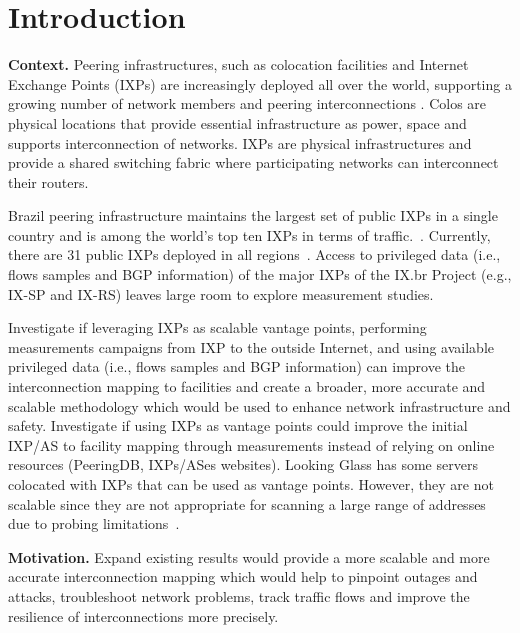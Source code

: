 \chapter{Introduction}\label{cap:introduction}
\thispagestyle{empty}

	\textbf{Context.} Peering infrastructures, such as colocation facilities and Internet Exchange Points (IXPs) are increasingly deployed all over the world, supporting a growing number of network members and peering interconnections \cite{Giotsas:2017:DPI:3098822.3098855}. Colos are physical locations that provide essential infrastructure as power, space and supports interconnection of networks. IXPs are physical infrastructures and provide a shared switching fabric where participating networks can interconnect their routers. \cite{Giotsas:2015:MPI:2716281.2836122}

	Brazil peering infrastructure maintains the largest set of public IXPs in a single country and is among the world’s top ten IXPs in terms of traffic.~\cite{DissectingBrazilianIXP}. Currently, there are 31 public IXPs deployed in all regions~\cite{IXbr}. Access to privileged data (i.e., flows samples and BGP information) of the major IXPs of the IX.br Project (e.g., IX-SP and IX-RS) leaves large room to explore measurement studies. 

	Investigate if leveraging IXPs as scalable vantage points, performing measurements campaigns from IXP to the outside Internet, and using available privileged data (i.e., flows samples and BGP information) can improve the interconnection mapping to facilities and create a broader, more accurate and scalable methodology which would be used to enhance network infrastructure and safety. 
	Investigate if using IXPs as vantage points could improve the initial IXP/AS to facility mapping through measurements instead of relying on online resources (PeeringDB, IXPs/ASes websites).	Looking Glass has some servers colocated with IXPs that can be used as vantage points. However, they are not scalable since they are not appropriate for scanning a large range of addresses due to probing limitations~\cite{Giotsas:2015:MPI:2716281.2836122}.



	\textbf{Motivation.} Expand existing results would provide a more scalable and more accurate interconnection mapping which would help to pinpoint outages and attacks, troubleshoot network problems, track traffic flows and improve the resilience of interconnections more precisely.

